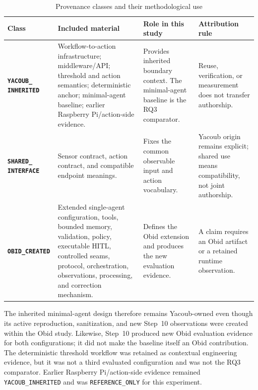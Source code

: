 \begin{table}[H]
\centering
\caption{Provenance classes and their methodological use}
\label{tab:method-provenance}

\begingroup
\footnotesize
\setlength{\tabcolsep}{3.5pt}
\renewcommand{\arraystretch}{1.15}

\begin{tabularx}{\textwidth}{
  @{}
  L{0.18\textwidth}
  L{0.27\textwidth}
  L{0.29\textwidth}
  Y
  @{}
}
\toprule
\textbf{Class}
&
\textbf{Included material}
&
\textbf{Role in this study}
&
\textbf{Attribution rule}
\\
\midrule

\textbf{\texttt{YACOUB\_}}\newline
\textbf{\texttt{INHERITED}}
&
Workflow-to-action infrastructure; middleware/API; threshold and action
semantics; deterministic anchor; minimal-agent baseline; earlier
Raspberry Pi/action-side evidence.
&
Provides inherited boundary context. The minimal-agent baseline is the
RQ3 comparator.
&
Reuse, verification, or measurement does not transfer authorship.
\\
\addlinespace[2pt]

\textbf{\texttt{SHARED\_}}\newline
\textbf{\texttt{INTERFACE}}
&
Sensor contract, action contract, and compatible endpoint meanings.
&
Fixes the common observable input and action vocabulary.
&
Yacoub origin remains explicit; shared use means compatibility, not
joint authorship.
\\
\addlinespace[2pt]

\textbf{\texttt{OBID\_CREATED}}
&
Extended single-agent configuration, tools, bounded memory, validation,
policy, executable HITL, controlled seams, protocol, orchestration,
observations, processing, and correction mechanism.
&
Defines the Obid extension and produces the new evaluation evidence.
&
A claim requires an Obid artifact or a retained runtime observation.
\\

\bottomrule
\end{tabularx}
\endgroup
\end{table}

The inherited minimal-agent design therefore remains Yacoub-owned even though
its active reproduction, sanitization, and new Step~10 observations were
created within the Obid study. Likewise, Step~10 produced new Obid evaluation
evidence for both configurations; it did not make the baseline itself an Obid
contribution. The deterministic threshold workflow was retained as contextual
engineering evidence, but it was not a third evaluated configuration and was
not the RQ3 comparator. Earlier Raspberry Pi/action-side evidence remained
\texttt{YACOUB\_INHERITED} and was \texttt{REFERENCE\_ONLY} for this
experiment.

